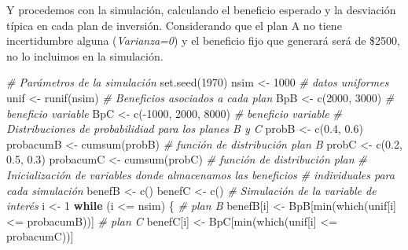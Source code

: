 \documentclass[
]{book}
\newenvironment{Shaded}{\begin{snugshade}}{\end{snugshade}}
\newcommand{\CommentTok}[1]{\textcolor[rgb]{0.56,0.35,0.01}{\textit{#1}}}
\newcommand{\ControlFlowTok}[1]{\textcolor[rgb]{0.13,0.29,0.53}{\textbf{#1}}}
\newcommand{\DecValTok}[1]{\textcolor[rgb]{0.00,0.00,0.81}{#1}}
\newcommand{\FloatTok}[1]{\textcolor[rgb]{0.00,0.00,0.81}{#1}}
\newcommand{\FunctionTok}[1]{\textcolor[rgb]{0.00,0.00,0.00}{#1}}
\newcommand{\NormalTok}[1]{#1}
\newcommand{\OtherTok}[1]{\textcolor[rgb]{0.56,0.35,0.01}{#1}}
\newcommand{\SpecialCharTok}[1]{\textcolor[rgb]{0.00,0.00,0.00}{#1}}
\theoremstyle{definition}
\theoremstyle{definition}
\theoremstyle{definition}
\theoremstyle{definition}
\theoremstyle{remark}
\begin{document}
Y procedemos con la simulación, calculando el beneficio esperado y la desviación típica en cada plan de inversión. Considerando que el plan A no tiene incertidumbre alguna (\emph{Varianza=0}) y el beneficio fijo que generará será de \$2500, no lo incluimos en la simulación.

\begin{Shaded}
\begin{Highlighting}[]
\CommentTok{\# Parámetros de la simulación}
\FunctionTok{set.seed}\NormalTok{(}\DecValTok{1970}\NormalTok{)}
\NormalTok{nsim }\OtherTok{\textless{}{-}} \DecValTok{1000}
\CommentTok{\# datos uniformes}
\NormalTok{unif }\OtherTok{\textless{}{-}} \FunctionTok{runif}\NormalTok{(nsim)}
\CommentTok{\# Beneficios asociados a cada plan}
\NormalTok{BpB }\OtherTok{\textless{}{-}} \FunctionTok{c}\NormalTok{(}\DecValTok{2000}\NormalTok{, }\DecValTok{3000}\NormalTok{)  }\CommentTok{\# beneficio variable}
\NormalTok{BpC }\OtherTok{\textless{}{-}} \FunctionTok{c}\NormalTok{(}\SpecialCharTok{{-}}\DecValTok{1000}\NormalTok{, }\DecValTok{2000}\NormalTok{, }\DecValTok{8000}\NormalTok{) }\CommentTok{\# beneficio variable}
\CommentTok{\# Distribuciones de probabilidiad para los planes B y C}
\NormalTok{probB }\OtherTok{\textless{}{-}} \FunctionTok{c}\NormalTok{(}\FloatTok{0.4}\NormalTok{, }\FloatTok{0.6}\NormalTok{)}
\NormalTok{probacumB }\OtherTok{\textless{}{-}} \FunctionTok{cumsum}\NormalTok{(probB) }\CommentTok{\# función de distribución plan B}
\NormalTok{probC }\OtherTok{\textless{}{-}} \FunctionTok{c}\NormalTok{(}\FloatTok{0.2}\NormalTok{, }\FloatTok{0.5}\NormalTok{, }\FloatTok{0.3}\NormalTok{)}
\NormalTok{probacumC }\OtherTok{\textless{}{-}} \FunctionTok{cumsum}\NormalTok{(probC) }\CommentTok{\# función de distribución plan }
\CommentTok{\# Inicialización de variables donde almacenamos las beneficios }
\CommentTok{\# individuales para cada simulación}
\NormalTok{benefB }\OtherTok{\textless{}{-}} \FunctionTok{c}\NormalTok{()}
\NormalTok{benefC }\OtherTok{\textless{}{-}} \FunctionTok{c}\NormalTok{()}
\CommentTok{\# Simulación de la variable de interés}
\NormalTok{i }\OtherTok{\textless{}{-}} \DecValTok{1}
\ControlFlowTok{while}\NormalTok{ (i }\SpecialCharTok{\textless{}=}\NormalTok{ nsim)}
\NormalTok{\{}
  \CommentTok{\# plan B}
\NormalTok{  benefB[i] }\OtherTok{\textless{}{-}}\NormalTok{ BpB[}\FunctionTok{min}\NormalTok{(}\FunctionTok{which}\NormalTok{(unif[i] }\SpecialCharTok{\textless{}=}\NormalTok{ probacumB))] }
  \CommentTok{\# plan C}
\NormalTok{  benefC[i] }\OtherTok{\textless{}{-}}\NormalTok{ BpC[}\FunctionTok{min}\NormalTok{(}\FunctionTok{which}\NormalTok{(unif[i] }\SpecialCharTok{\textless{}=}\NormalTok{ probacumC))]  }

\end{Highlighting}
\end{Shaded}
\end{document}
